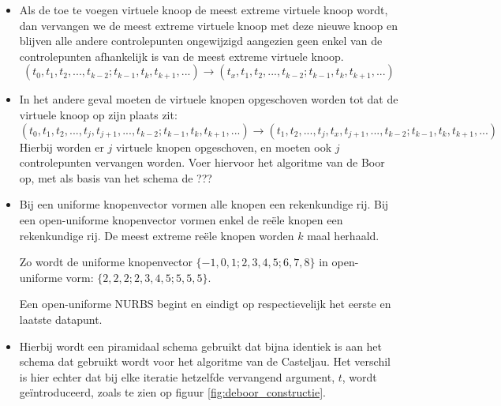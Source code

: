 \begin{itemize}
{		\begin{itemize} 
			\item Als de toe te voegen virtuele knoop de meest extreme virtuele knoop wordt, dan vervangen we de meest extreme virtuele knoop met deze nieuwe knoop en blijven alle andere controlepunten ongewijzigd aangezien geen enkel van de controlepunten afhankelijk is van de meest extreme virtuele knoop. 
			$$(t_0, t_1, t_2, ..., t_{k - 2} ; t_{k - 1}, t_k, t_{k + 1}, ...) \rightarrow (t_x, t_1, t_2, ..., t_{k - 2} ; t_{k - 1}, t_k, t_{k + 1}, ...)$$

			\item In het andere geval moeten de virtuele knopen opgeschoven worden tot dat de virtuele knoop op zijn plaats zit:
			$$(t_0, t_1, t_2, ..., t_j, t_{j + 1}, ..., t_{k - 2} ; t_{k - 1}, t_k, t_{k + 1}, ...) \rightarrow (t_1, t_2, ..., t_j, t_x, t_{j + 1}, ..., t_{k - 2} ; t_{k - 1}, t_k, t_{k + 1}, ...)$$
			Hierbij worden er $j$ virtuele knopen opgeschoven, en moeten ook $j$ controlepunten vervangen worden. Voer hiervoor het algoritme van de Boor op, met als basis van het schema de  ??? 
		\end{itemize}
	}
	{
		\begin{itemize} 
			\item Bij een uniforme knopenvector vormen alle knopen een rekenkundige rij. Bij een open-uniforme knopenvector vormen enkel de reële knopen een rekenkundige rij. De meest extreme reële knopen worden $k$ maal herhaald. 

			Zo wordt de uniforme knopenvector $\{-1, 0, 1; 2, 3, 4, 5 ; 6, 7, 8 \}$ in open-uniforme vorm: $\{2, 2, 2; 2, 3, 4, 5; 5, 5, 5\}$. 

			Een open-uniforme NURBS begint en eindigt op respectievelijk het eerste en laatste datapunt.
		\end{itemize}
	}
	{
		\begin{itemize} 
			\item Hierbij wordt een piramidaal schema gebruikt dat bijna identiek is aan het schema dat gebruikt wordt voor het algoritme van de Casteljau. Het verschil is hier echter dat bij elke iteratie hetzelfde vervangend argument, $t$, wordt geïntroduceerd, zoals te zien op figuur \ref{fig:deboor_constructie}.


\end{itemize}}
\end{itemize}
